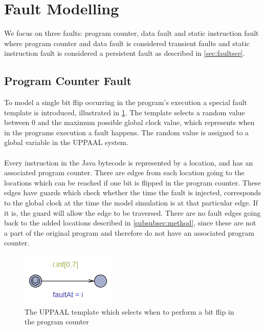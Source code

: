 \section{Fault Modelling}
We focus on three faults: program counter, data fault and static instruction fault where program counter and data fault is considered transient faults and static instruction fault is considered a persistent fault as described in \cref{sec:faultsce}.

\subsection{Program Counter Fault}
To model a single bit flip occurring in the program's execution a special fault template is introduced, illustrated in \cref{fig:faultTime}. The template selects a random value between $0$ and the maximum possible global clock value, which represents when in the programs execution a fault happens. The random value is assigned to a global variable in the UPPAAL system.\\\\
Every instruction in the Java bytecode is represented by a location, and has an associated program counter. There are edges from each location going to the locations which can be reached if one bit is flipped in the program counter. These edges have guards which check whether the time the fault is injected, corresponds to the global clock at the time the model simulation is at that particular edge. If it is, the guard will allow the edge to be traversed. There are no fault edges going back to the added locations described in \cref{subsubsec:method}, since these are not a part of the original program and therefore do not have an associated program counter.
\begin{figure}[H]
\centering
\includegraphics{figures/fault.PNG}
\caption{The UPPAAL template which selects when to perform a bit flip in the program counter}
\label{fig:faultTime}
\end{figure}

